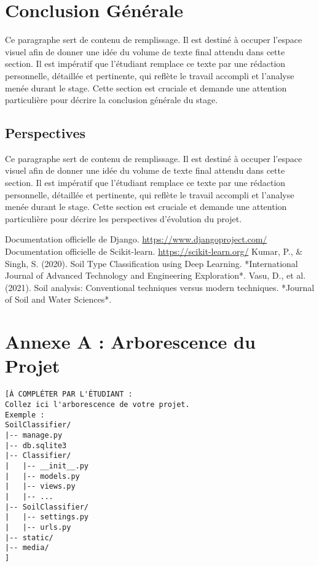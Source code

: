 \documentclass[12pt, a4paper]{report}
\begin{document}
\chapter*{Conclusion Générale}
Ce paragraphe sert de contenu de remplissage. Il est destiné à occuper l'espace visuel afin de donner une idée du volume de texte final attendu dans cette section. Il est impératif que l'étudiant remplace ce texte par une rédaction personnelle, détaillée et pertinente, qui reflète le travail accompli et l'analyse menée durant le stage. Cette section est cruciale et demande une attention particulière pour décrire la conclusion générale du stage.

\section*{Perspectives}
Ce paragraphe sert de contenu de remplissage. Il est destiné à occuper l'espace visuel afin de donner une idée du volume de texte final attendu dans cette section. Il est impératif que l'étudiant remplace ce texte par une rédaction personnelle, détaillée et pertinente, qui reflète le travail accompli et l'analyse menée durant le stage. Cette section est cruciale et demande une attention particulière pour décrire les perspectives d'évolution du projet.

\begin{thebibliography}{9}
Documentation officielle de Django. \url{https://www.djangoproject.com/}
Documentation officielle de Scikit-learn. \url{https://scikit-learn.org/}
Kumar, P., \& Singh, S. (2020). Soil Type Classification using Deep Learning. *International Journal of Advanced Technology and Engineering Exploration*.
Vasu, D., et al. (2021). Soil analysis: Conventional techniques versus modern techniques. *Journal of Soil and Water Sciences*.
\end{thebibliography}

\appendix
\chapter{Annexe A : Arborescence du Projet}
\begin{verbatim}
[À COMPLÉTER PAR L'ÉTUDIANT :
Collez ici l'arborescence de votre projet.
Exemple :
SoilClassifier/
|-- manage.py
|-- db.sqlite3
|-- Classifier/
|   |-- __init__.py
|   |-- models.py
|   |-- views.py
|   |-- ...
|-- SoilClassifier/
|   |-- settings.py
|   |-- urls.py
|-- static/
|-- media/
]
\end{verbatim}
\end{document}
